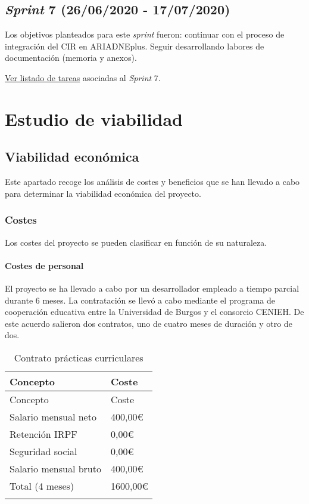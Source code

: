 \subsection{\emph{Sprint} 7 (26/06/2020 - 17/07/2020)}
Los objetivos planteados para este \emph{sprint} fueron: continuar con
el proceso de integración del CIR en ARIADNEplus. Seguir desarrollando
labores de documentación (memoria y anexos).

\href{https://github.com/gcm1001/TFG-CeniehAriadne/milestone/8}{Ver
listado de tareas} asociadas al \emph{Sprint} 7.


\section{Estudio de viabilidad}

\subsection{Viabilidad económica}

Este apartado recoge los análisis de costes y beneficios que se han
llevado a cabo para determinar la viabilidad económica del proyecto.

\subsubsection{Costes}

Los costes del proyecto se pueden clasificar en función de su
naturaleza.

\paragraph{Costes de personal}

El proyecto se ha llevado a cabo por un desarrollador empleado a tiempo
parcial durante 6 meses. La contratación se llevó a cabo mediante el
programa de cooperación educativa entre la Universidad de Burgos y el
consorcio CENIEH. De este acuerdo salieron dos contratos, uno de cuatro
meses de duración y otro de dos.

\begin{longtable}[]{@{}ll@{}}
\toprule
Concepto & Coste\tabularnewline
\midrule
\endfirsthead
\toprule
Concepto & Coste\tabularnewline
\midrule
\endhead
Salario mensual neto & 400,00\euro{}\tabularnewline
Retención IRPF & 0,00\euro{}\tabularnewline
Seguridad social & 0,00\euro{}\tabularnewline
Salario mensual bruto & 400,00\euro{}\tabularnewline
Total (4 meses) & 1600,00\euro{}\tabularnewline
\bottomrule
\caption{Contrato prácticas curriculares}
\end{longtable}

